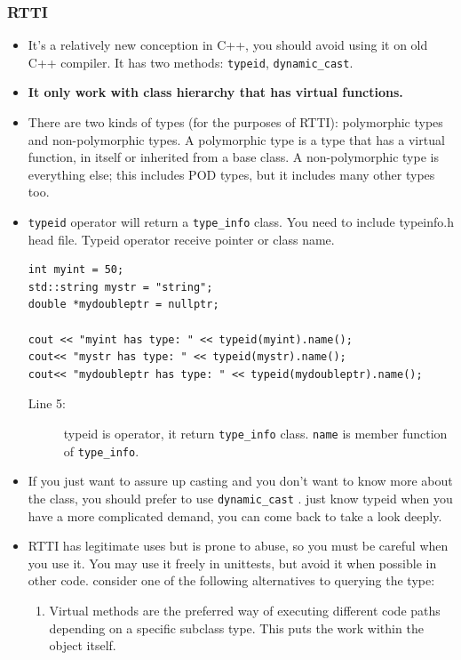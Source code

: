 \documentclass[a4paper,11pt,twoside]{book}
\begin{document}
\subsubsection{RTTI}
\begin{itemize}
	\item It's a relatively new conception in C++, you should avoid using it on old C++ compiler. It has two methods: \texttt{typeid}, \texttt{dynamic\_cast}.
	
	\item \textbf{It only work with class hierarchy that has virtual functions. }
	
	\item There are two kinds of types (for the purposes of RTTI): polymorphic types and non-polymorphic types. A polymorphic type is a type that has a virtual function, in itself or inherited from a base class. A non-polymorphic type is everything else; this includes POD types, but it includes many other types too.
	
	\item \texttt{typeid} operator will return a \texttt{type\_info} class.  You need to include typeinfo.h head file. Typeid operator receive pointer or class name.
	
\begin{lstlisting}
int myint = 50;
std::string mystr = "string";
double *mydoubleptr = nullptr;
	
cout << "myint has type: " << typeid(myint).name();
cout<< "mystr has type: " << typeid(mystr).name();
cout<< "mydoubleptr has type: " << typeid(mydoubleptr).name();
\end{lstlisting}
\begin{description}
	\item[Line 5:] typeid is operator, it return \texttt{type\_info} class. \texttt{name} is member function of \texttt{type\_info}.
\end{description}

	\item If you just want to assure up casting and you don't want to know more about the class, you should prefer to use \texttt{dynamic\_cast} . just know typeid when you have a more complicated demand, you can come back to take a look deeply.
	
	\item RTTI has legitimate uses but is prone to abuse, so you must be careful when you use it. You may use it freely in unittests, but avoid it when possible in other code. consider one of the following alternatives to querying the type:
	\begin{enumerate}
		\item Virtual methods are the preferred way of executing different code paths depending on a specific subclass type. This puts the work within the object itself.
		

\end{enumerate}
\end{itemize}
\end{document}
